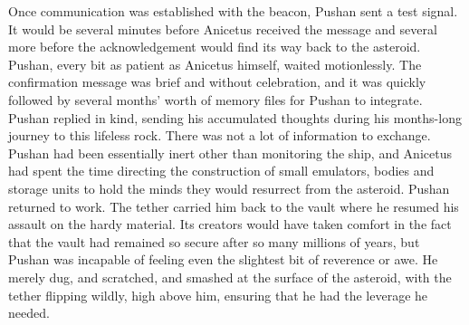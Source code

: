 \documentclass[a4paper]{article}
\begin{document}
Once communication was established with the beacon, Pushan sent a test signal. It would be several minutes before Anicetus received the message and several more before the acknowledgement would find its way back to the asteroid. Pushan, every bit as patient as Anicetus himself, waited motionlessly.
The confirmation message was brief and without celebration, and it was quickly followed by several months' worth of memory files for Pushan to integrate. Pushan replied in kind, sending his accumulated thoughts during his months-long journey to this lifeless rock. There was not a lot of information to exchange. Pushan had been essentially inert other than monitoring the ship, and Anicetus had spent the time directing the construction of small emulators, bodies and storage units to hold the minds they would resurrect from the asteroid.
Pushan returned to work. The tether carried him back to the vault where he resumed his assault on the hardy material. Its creators would have taken comfort in the fact that the vault had remained so secure after so many millions of years, but Pushan was incapable of feeling even the slightest bit of reverence or awe. He merely dug, and scratched, and smashed at the surface of the asteroid, with the tether flipping wildly, high above him, ensuring that he had the leverage he needed.
\end{document}
